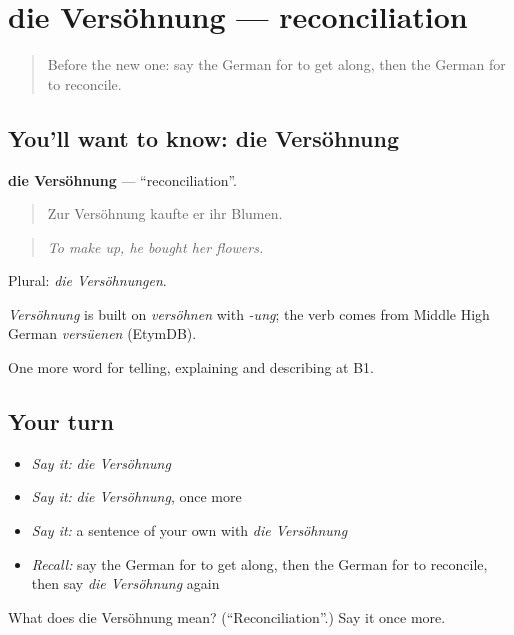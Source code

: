 \section[die Versöhnung]{die Versöhnung — reconciliation}

\label{lesson:GE-C494-versoehnung}



\begin{quote}
Before the new one: say the German for to get along, then the German for to reconcile.
\end{quote}

\subsection*{You'll want to know: die Versöhnung}
\textbf{die Versöhnung} — \textquotedblleft{}reconciliation\textquotedblright{}.

\begin{quote}
Zur Versöhnung kaufte er ihr Blumen.
\end{quote}

\begin{quote}
\emph{To make up, he bought her flowers.}
\end{quote}

Plural: \emph{die Versöhnungen}.

\begin{cousinweb}
\emph{Versöhnung} is built on \emph{versöhnen} with \emph{-ung}; the verb comes from Middle High German \emph{versüenen} (EtymDB).
\end{cousinweb}

\begin{grammarlens}[title={What you've built}]
One more word for telling, explaining and describing at B1.
\end{grammarlens}

\subsection*{Your turn}
\begin{itemize}
\raggedright
  \item \emph{Say it:} \emph{die Versöhnung}
  \item \emph{Say it:} \emph{die Versöhnung}, once more
  \item \emph{Say it:} a sentence of your own with \emph{die Versöhnung}
  \item \emph{Recall:} say the German for to get along, then the German for to reconcile, then say \emph{die Versöhnung} again
\end{itemize}

\begin{tcolorbox}[breakable,colback=teal!4,colframe=teal!35!black,title={Before you move on}]
What does die Versöhnung mean? (\textquotedblleft{}Reconciliation\textquotedblright{}.) Say it once more.
\end{tcolorbox}
